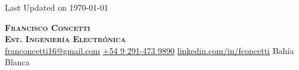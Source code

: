 \documentclass[a4paper,11pt]{article}
\begin{document}
\begin{flushright}
  \color{gray}
  \item
  Last Updated on \today
\end{flushright}

\vspace{-4pt}

\begin{center}
    
    \textbf{\Huge \scshape Francisco Concetti} \\ \vspace{4pt}
    \medskip 
    \textbf{\Large \scshape Est. Ingeniería Electrónica} \\ \vspace{4pt}
    \medskip
    \href{mailto:franconcetti16@gmail.com}
    {franconcetti16@gmail.com}    
    \hspace{0.25cm} 
    \href{tel:+5492914739890}{+54 9 291-473 9890}      
    \hspace{0.25cm}    
    \href{https://www.linkedin.com/in/francisco-concetti-5258b7232/}{{linkedin.com/in/fconcetti}}
    \hspace{0.25cm}    
    {Bahía Blanca} $  $
    \vspace{1pt}
\end{center}







%
\end{document}
